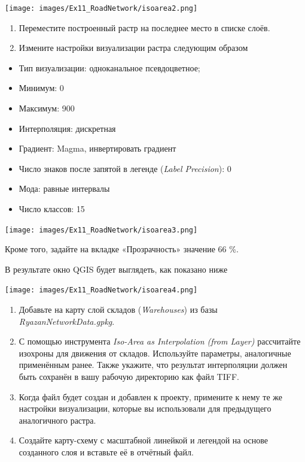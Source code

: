 \documentclass[
  12pt,
]{book}
\providecommand{\tightlist}{%
  \setlength{\itemsep}{0pt}\setlength{\parskip}{0pt}}
\begin{document}
\texttt{[image: images/Ex11\_RoadNetwork/isoarea2.png]}

\begin{enumerate}
\def\labelenumi{\arabic{enumi}.}
\setcounter{enumi}{6}
\item
  Переместите построенный растр на последнее место в списке слоёв.
\item
  Измените настройки визуализации растра следующим образом
\end{enumerate}

\begin{itemize}
\tightlist
\item
  Тип визуализации: одноканальное псевдоцветное;
\item
  Минимум: 0
\item
  Максимум: 900
\item
  Интерполяция: дискретная
\item
  Градиент: Magma, инвертировать градиент
\item
  Число знаков после запятой в легенде (\emph{Label Precision}): 0
\item
  Мода: равные интервалы
\item
  Число классов: 15
\end{itemize}

\texttt{[image: images/Ex11\_RoadNetwork/isoarea3.png]}

Кроме того, задайте на вкладке «Прозрачность» значение 66 \%.

В результате окно QGIS будет выглядеть, как показано ниже

\texttt{[image: images/Ex11\_RoadNetwork/isoarea4.png]}

\begin{enumerate}
\def\labelenumi{\arabic{enumi}.}
\setcounter{enumi}{8}
\item
  Добавьте на карту слой складов (\emph{Warehouses}) из базы \emph{RyazanNetworkData.gpkg}.
\item
  С помощью инструмента \emph{Iso-Area as Interpolation (from Layer)} рассчитайте изохроны для движения от складов. Используйте параметры, аналогичные применённым ранее. Также укажите, что результат интерполяции должен быть сохранён в вашу рабочую директорию как файл TIFF.
\item
  Когда файл будет создан и добавлен к проекту, примените к нему те же настройки визуализации, которые вы использовали для предыдущего аналогичного растра.
\item
  Создайте карту-схему с масштабной линейкой и легендой на основе созданного слоя и вставьте её в отчётный файл.
\end{enumerate}
\end{document}
